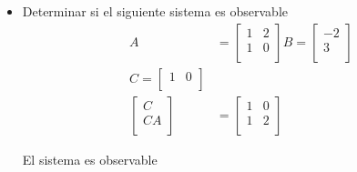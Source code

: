 \documentclass[12pt]{article}
\begin{document}
\begin{itemize}
    \item Determinar si el siguiente sistema es observable
    \begin{equation}
        \begin{split}
            A&=
            \begin{bmatrix}
                1 & 2 \\
                1 & 0 \\
            \end{bmatrix}
            B=
            \begin{bmatrix}
                -2 \\
                3 \\
            \end{bmatrix}\\
            C=
            \begin{bmatrix}
                1 & 0\\
            \end{bmatrix}\\
            \begin{bmatrix}
                C \\
                CA \\
            \end{bmatrix}&=
            \begin{bmatrix}
                1 & 0 \\
                1 & 2 \\
            \end{bmatrix}
        \end{split}
        \label{eq:controla1}
    \end{equation}

    El sistema es observable


\end{itemize}
\end{document}
